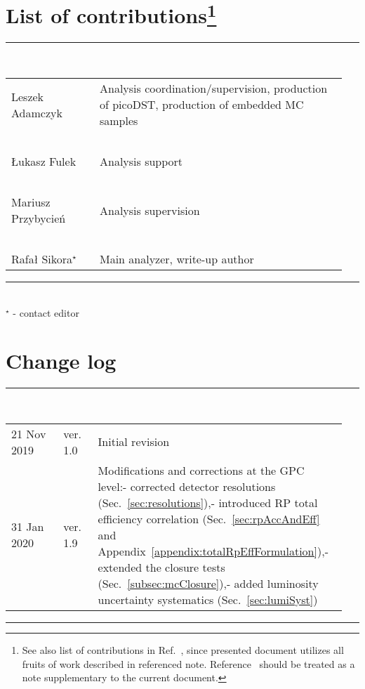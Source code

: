\section*{\LARGE List of contributions\footnote{See also list of contributions in Ref.~\cite{supplementaryNote}, since presented document utilizes all fruits of work described in referenced note. Reference~\cite{supplementaryNote} should be treated as a note supplementary to the current document.}}%
%
   \rule{\textwidth}{1.0pt}\\[5pt]%
      \begin{tabular}{>{\raggedright}p{0.25\linewidth}p{0.7\linewidth}}
		Leszek Adamczyk & Analysis coordination/supervision, production of picoDST, production of embedded MC samples\\
		~&~\\
		Łukasz Fulek & Analysis support\\
		~&~\\
		Mariusz Przybycień & Analysis supervision\\
		~&~\\
        Rafał Sikora$^{\star}$  & Main analyzer, write-up author\\
      \end{tabular}\newline
   \rule{\textwidth}{1.0pt}\\[10pt]%
   $^{\star}$ - contact editor
   \\[50pt]%
\section*{\LARGE Change log}%
%
  \rule{\textwidth}{1.0pt}\\[5pt]%
  \begin{tabular}{>{\raggedright}p{0.15\linewidth}p{0.1\linewidth}p{0.7\linewidth}}
  	21 Nov 2019 & ver. 1.0 & Initial revision\\
  	31 Jan 2020 & ver. 1.9 & Modifications and corrections at the GPC level:\newline- corrected detector resolutions (Sec.~\ref{sec:resolutions}),\newline- introduced RP total efficiency correlation (Sec.~\ref{sec:rpAccAndEff} and Appendix~\ref{appendix:totalRpEffFormulation}),\newline- extended the closure tests (Sec.~\ref{subsec:mcClosure}),\newline- added luminosity uncertainty systematics (Sec.~\ref{sec:lumiSyst})
  \end{tabular}\newline%
 \rule{\textwidth}{1.0pt}
